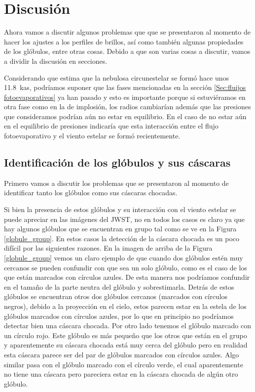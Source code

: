 \documentclass{book}
\begin{document}
\chapter{Discusión}\label{Chp:conclusiones}

Ahora vamos a discutir algunos problemas que que se presentaron al momento de hacer los ajustes a los perfiles de brillos, así como también algunas propiedades de los glóbulos, entre otras cosas. Debido a que son varias cosas a discutir, vamos a dividir la discusión en secciones.

Considerando que \cite{Zavala:2022} estima que la nebulosa circunestelar se formó hace unos \SI{11.8}{kas}, podríamos suponer que las fases mencionadas en la sección \ref{Sec:fluijos fotoevaporativos} ya han pasado y esto es importante porque si estuviéramos en otra fase como en la de implosión, los radios cambiarían además que las presiones que consideramos podrían aún no estar en equilibrio. En el caso de no estar aún en el equilibrio de presiones indicaría que esta interacción entre el flujo fotoevaporativo y el viento estelar se formó recientemente.\\

\section{Identificación de los glóbulos y sus cáscaras}\label{dis:casaras}

Primero vamos a discutir los problemas que se presentaron al momento de identificar tanto los glóbulos como sus cáscaras chocadas.

Si bien la presencia de estos glóbulos y su interacción con el viento estelar se puede apreciar en las imágenes del JWST, no en todos los casos es claro ya que hay algunos glóbulos que se encuentran en grupo tal como se ve en la Figura \ref{globule_group}. En estos casos la detección de la cáscara chocada es un poco difícil por las siguientes razones. En la imagen de arriba de la Figura \ref{globule_group} vemos un claro ejemplo de que cuando dos glóbulos estén muy cercanos se pueden confundir con que sea un solo glóbulo, como es el caso de los que están marcados con círculos azules. De esta manera nos podríamos confundir en el tamaño de la parte neutra del glóbulo y sobrestimarla. Detrás de estos glóbulos se encuentran otros dos glóbulos cercanos (marcados con círculos negros), debido a la proyección en el cielo, estos parecen estar en la estela de los glóbulos marcados con círculos azules, por lo que en principio no podríamos detectar bien una cáscara chocada. Por otro lado tenemos el glóbulo marcado con un círculo rojo. Este glóbulo es más pequeño que los otros que están en el grupo y aparentemente su cáscara chocada está muy cerca del glóbulo pero en realidad esta cáscara parece ser del par de glóbulos marcados con círculos azules. Algo similar pasa con el glóbulo marcado con el círculo verde, el cual aparentemente no tiene una cáscara pero pareciera estar en la cáscara chocada de algún otro glóbulo.
\end{document}
